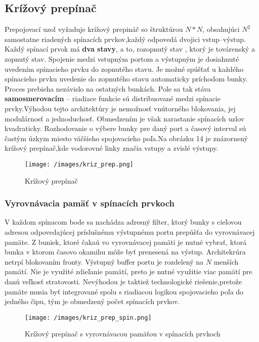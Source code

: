 \subsection {Krížový prepínač}
Prepojovací uzol vyžaduje krížový prepináč so štruktúrou $N*N$, obsahujúci $N^2$ samostatne riadených spínacích prvkov,každý odpovedá dvojici vstup--výstup. Každý spínací prvok má \textbf{dva stavy}, a to, rozopnutý stav , ktorý je továrenský a zopnutý stav.
Spojenie medzi vstupným portom a výstupným je dosiahnuté uvedením spínacieho prvku do zopnutého stavu. Je možné spúšťať u každého spínacieho prvku uvedenie do zopnutého stavu automaticky príchodom bunky. Proces prebieha nezávislo na ostatných bunkách. Pole sa tak stáva \textbf{samosmerovacím} -- riadiace funkcie sú distribuované medzi spínacie prvky.Výhodou tejto architektúry je nemožnosť vnútorného blokovania, jej modulárnosť a jednoduchosť. Obmedzením je však narastanie spínacích uzlov kvadraticky. Rozhodovanie o výbere bunky pre daný port a časový interval sú častým úzkym miesto väčšieho spojovacieho poľa.Na obrázku 14 je znázornený krížový prepínač,kde vodorovné linky značia vstupy a zvislé výstupy.

\begin{figure}[ht]
\centering
  \begin{center}
    \texttt{[image: /images/kriz\_prep.png]}
  \end{center}
  \caption[Krížový prepínač]{Krížový prepínač}
\end{figure}

\subsubsection{Vyrovnávacia pamäť v spínacích prvkoch}
V každom spínacom bode sa nachádza adresný filter, ktorý bunky s cieľovou adresou odpovedajúcej príslušnému výstupnému portu prepúšťa do vyrovnávacej pamäte. Z buniek, ktoré čakaú vo vyrovnávacej pamäti je nutné vybrať, ktorá bunka v ktorom časovo okamihu môže byť prenesená na výstup. Architekrúra netrpí blokovaním fronty. Výstupný buffer portu je rozdelený na $N$ menších pamätí. Nie je využité zdieľanie pamätí, preto je nutné využitie viac pamätí pre danú veľkosť stratovosti. Nevýhodou je taktiež technologické riešenie,pretože pamäte musia byť integrované spolu s riadiacou logikou spojovacieho poľa do jedného čipu, tým je obmedzený počet spínacích prvkov.


\begin{figure}[ht]
\centering
  \begin{center}
    \texttt{[image: /images/kriz\_prep\_spin.png]}
  \end{center}
  \caption[Krížový prepínač s vyrovnávacou pamäťou v spínacích prvkoch]{Krížový prepínač s vyrovnávacou pamäťou v spínacích prvkoch}
\end{figure}

